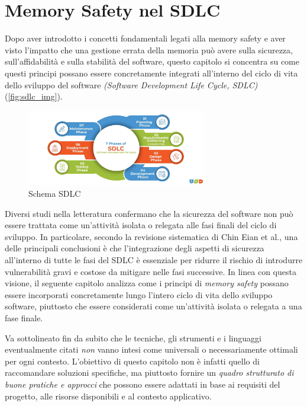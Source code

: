 \chapter{Memory Safety nel SDLC}
\label{cha:sdlc}

Dopo aver introdotto i concetti fondamentali legati alla memory safety e aver
visto l'impatto che una gestione errata della memoria può avere sulla sicurezza,
sull'affidabilità e sulla stabilità del software, questo capitolo si concentra
su come questi principi possano essere concretamente integrati all'interno del
ciclo di vita dello sviluppo del software \textit{(Software Development Life Cycle,
SDLC)}(\autoref{fig:sdlc_img}).

\begin{figure}[htbp]
  \centering
  \includegraphics[width=0.7\textwidth]{images/sdlc.png}
  \caption[Schema SDLC]{Schema SDLC\protect\footnotemark}
  \label{fig:sdlc_img}
\end{figure}

Diversi studi nella letteratura confermano che la sicurezza del software non può
essere trattata come un'attività isolata o relegata alle fasi finali del ciclo di
sviluppo. In particolare, secondo la revisione sistematica di Chin Eian et al.\cite{security_in_sdlc},
una delle principali conclusioni è che l'integrazione degli aspetti di sicurezza
all'interno di tutte le fasi del SDLC è essenziale per ridurre il rischio di
introdurre vulnerabilità gravi e costose da mitigare nelle fasi successive. In linea
con questa visione, il seguente capitolo analizza come i principi di \textit{memory
safety} possano essere incorporati concretamente lungo l'intero ciclo di vita dello
sviluppo software, piuttosto che essere considerati come un'attività
isolata o relegata a una fase finale.

Va sottolineato fin da subito che le tecniche, gli strumenti e i linguaggi
eventualmente citati \textit{non} vanno intesi come universali o necessariamente
ottimali per ogni contesto. L'obiettivo di questo capitolo non è infatti quello
di raccomandare soluzioni specifiche, ma piuttosto fornire un \textit{quadro
strutturato di buone pratiche e approcci} che possono essere adattati in base ai
requisiti del progetto, alle risorse disponibili e al contesto applicativo.





